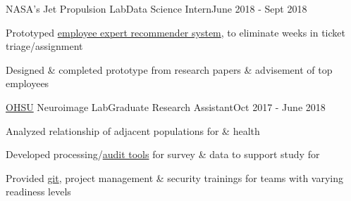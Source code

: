 \documentclass{article}
\newcommand{\LU}[1]{\hspace{-1em}{\bf Technologies : #1}}
\def\PT{{\bf(Part Time)}\xspace}
\def\grd{Graduate\xspace}
\begin{document}

\begin{**mylist}{NASA's Jet Propulsion Lab}{Data Science Intern}{June 2018 - Sept 2018}
\item Prototyped \href{https://www.youtube.com/watch?v=_Oa4aSXjzhs}{employee expert recommender system}, to eliminate weeks in ticket triage/assignment
\item Designed \& completed prototype from research papers \& advisement of top  employees
\end{**mylist}


\begin{**mylist}[Medical]{\href{https://www.ohsu.edu/xd/research/centers-institutes/center-for-spoken-language-understanding/}{OHSU} Neuroimage Lab}{\grd Research Assistant}{Oct 2017 - June 2018}
\item Analyzed relationship of adjacent  populations for  \&  health
\item Developed processing/\href{https://gitlab.com/Fair_lab/HCPVaTT}{audit tools} for survey \&  data to support \href{https://abcdstudy.org/study-sites/ohsu/}{}  study for 
\item Provided \href{https://github.com/probinso/ABC}{git}, project management \& security trainings for teams with varying readiness levels
\end{**mylist}
\end{document}
